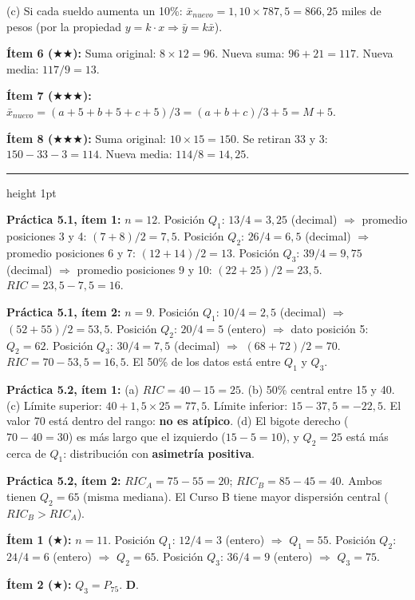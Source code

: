\documentclass[11pt, letterpaper]{article}
\newcommand{\subbloque}[1]{%
  \vspace{14pt}
  \noindent{\large\bfseries\color{zenitnavy} #1}\par
  \vspace{4pt}\hrule height 1pt\vspace{8pt}}
\begin{document}
(c) Si cada sueldo aumenta un 10\%: $\bar{x}_{nuevo} = 1{,}10\times787{,}5 = 866{,}25$ miles de pesos (por la propiedad $y=k\cdot x \Rightarrow \bar{y}=k\bar{x}$).

\textbf{Ítem 6 ($\bigstar\bigstar$):}
Suma original: $8\times12=96$. Nueva suma: $96+21=117$. Nueva media: $117/9=13$.

\textbf{Ítem 7 ($\bigstar\bigstar\bigstar$):}
$\bar{x}_{nuevo} = (a+5+b+5+c+5)/3 = (a+b+c)/3+5 = M+5$. \checkmark

\textbf{Ítem 8 ($\bigstar\bigstar\bigstar$):}
Suma original: $10\times15=150$. Se retiran 33 y 3: $150-33-3=114$. Nueva media: $114/8=14{,}25$.

\subbloque{Sección 5 --- Medidas de posición}

\textbf{Práctica 5.1, ítem 1:}
$n=12$. Posición $Q_1$: $13/4=3{,}25$ (decimal) $\Rightarrow$ promedio posiciones 3 y 4: $(7+8)/2=7{,}5$.
Posición $Q_2$: $26/4=6{,}5$ (decimal) $\Rightarrow$ promedio posiciones 6 y 7: $(12+14)/2=13$.
Posición $Q_3$: $39/4=9{,}75$ (decimal) $\Rightarrow$ promedio posiciones 9 y 10: $(22+25)/2=23{,}5$.
$RIC=23{,}5-7{,}5=16$.

\textbf{Práctica 5.1, ítem 2:}
$n=9$. Posición $Q_1$: $10/4=2{,}5$ (decimal) $\Rightarrow$ $(52+55)/2=53{,}5$.
Posición $Q_2$: $20/4=5$ (entero) $\Rightarrow$ dato posición 5: $Q_2=62$.
Posición $Q_3$: $30/4=7{,}5$ (decimal) $\Rightarrow$ $(68+72)/2=70$.
$RIC=70-53{,}5=16{,}5$. El 50\% de los datos está entre $Q_1$ y $Q_3$.

\textbf{Práctica 5.2, ítem 1:}
(a) $RIC=40-15=25$.
(b) 50\% central entre 15 y 40.
(c) Límite superior: $40+1{,}5\times25=77{,}5$. Límite inferior: $15-37{,}5=-22{,}5$. El valor 70 está dentro del rango: \textbf{no es atípico}.
(d) El bigote derecho ($70-40=30$) es más largo que el izquierdo ($15-5=10$), y $Q_2=25$ está más cerca de $Q_1$: distribución con \textbf{asimetría positiva}.

\textbf{Práctica 5.2, ítem 2:}
$RIC_A=75-55=20$; $RIC_B=85-45=40$. Ambos tienen $Q_2=65$ (misma mediana). El Curso B tiene mayor dispersión central ($RIC_B>RIC_A$).

\textbf{Ítem 1 ($\bigstar$):}
$n=11$. Posición $Q_1$: $12/4=3$ (entero) $\Rightarrow$ $Q_1=55$.
Posición $Q_2$: $24/4=6$ (entero) $\Rightarrow$ $Q_2=65$.
Posición $Q_3$: $36/4=9$ (entero) $\Rightarrow$ $Q_3=75$.

\textbf{Ítem 2 ($\bigstar$):}
$Q_3=P_{75}$. \textbf{D}.
\end{document}
